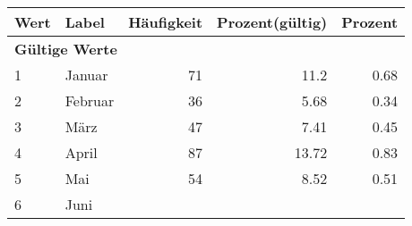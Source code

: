      \begin{longtable}{lXrrr}
     \toprule
     \textbf{Wert} & \textbf{Label} & \textbf{Häufigkeit} & \textbf{Prozent(gültig)} & \textbf{Prozent} \\
     \endhead
     \midrule
     \multicolumn{5}{l}{\textbf{Gültige Werte}}\\

     1 &
     \multicolumn{1}{X}{ Januar   } &


       \num{71} &
       \num[round-mode=places,round-precision=2]{11.2} &
         \num[round-mode=places,round-precision=2]{0.68} \\

     2 &
     \multicolumn{1}{X}{ Februar   } &


       \num{36} &
       \num[round-mode=places,round-precision=2]{5.68} &
         \num[round-mode=places,round-precision=2]{0.34} \\

     3 &
     \multicolumn{1}{X}{ März   } &


       \num{47} &
       \num[round-mode=places,round-precision=2]{7.41} &
         \num[round-mode=places,round-precision=2]{0.45} \\

     4 &
     \multicolumn{1}{X}{ April   } &


       \num{87} &
       \num[round-mode=places,round-precision=2]{13.72} &
         \num[round-mode=places,round-precision=2]{0.83} \\

     5 &
     \multicolumn{1}{X}{ Mai   } &


       \num{54} &
       \num[round-mode=places,round-precision=2]{8.52} &
         \num[round-mode=places,round-precision=2]{0.51} \\

     6 &
     \multicolumn{1}{X}{ Juni   } &



\end{longtable}
